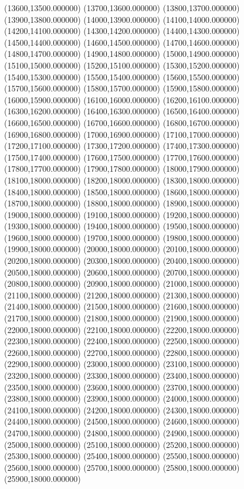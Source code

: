 (13600,13500.000000)
(13700,13600.000000)
(13800,13700.000000)
(13900,13800.000000)
(14000,13900.000000)
(14100,14000.000000)
(14200,14100.000000)
(14300,14200.000000)
(14400,14300.000000)
(14500,14400.000000)
(14600,14500.000000)
(14700,14600.000000)
(14800,14700.000000)
(14900,14800.000000)
(15000,14900.000000)
(15100,15000.000000)
(15200,15100.000000)
(15300,15200.000000)
(15400,15300.000000)
(15500,15400.000000)
(15600,15500.000000)
(15700,15600.000000)
(15800,15700.000000)
(15900,15800.000000)
(16000,15900.000000)
(16100,16000.000000)
(16200,16100.000000)
(16300,16200.000000)
(16400,16300.000000)
(16500,16400.000000)
(16600,16500.000000)
(16700,16600.000000)
(16800,16700.000000)
(16900,16800.000000)
(17000,16900.000000)
(17100,17000.000000)
(17200,17100.000000)
(17300,17200.000000)
(17400,17300.000000)
(17500,17400.000000)
(17600,17500.000000)
(17700,17600.000000)
(17800,17700.000000)
(17900,17800.000000)
(18000,17900.000000)
(18100,18000.000000)
(18200,18000.000000)
(18300,18000.000000)
(18400,18000.000000)
(18500,18000.000000)
(18600,18000.000000)
(18700,18000.000000)
(18800,18000.000000)
(18900,18000.000000)
(19000,18000.000000)
(19100,18000.000000)
(19200,18000.000000)
(19300,18000.000000)
(19400,18000.000000)
(19500,18000.000000)
(19600,18000.000000)
(19700,18000.000000)
(19800,18000.000000)
(19900,18000.000000)
(20000,18000.000000)
(20100,18000.000000)
(20200,18000.000000)
(20300,18000.000000)
(20400,18000.000000)
(20500,18000.000000)
(20600,18000.000000)
(20700,18000.000000)
(20800,18000.000000)
(20900,18000.000000)
(21000,18000.000000)
(21100,18000.000000)
(21200,18000.000000)
(21300,18000.000000)
(21400,18000.000000)
(21500,18000.000000)
(21600,18000.000000)
(21700,18000.000000)
(21800,18000.000000)
(21900,18000.000000)
(22000,18000.000000)
(22100,18000.000000)
(22200,18000.000000)
(22300,18000.000000)
(22400,18000.000000)
(22500,18000.000000)
(22600,18000.000000)
(22700,18000.000000)
(22800,18000.000000)
(22900,18000.000000)
(23000,18000.000000)
(23100,18000.000000)
(23200,18000.000000)
(23300,18000.000000)
(23400,18000.000000)
(23500,18000.000000)
(23600,18000.000000)
(23700,18000.000000)
(23800,18000.000000)
(23900,18000.000000)
(24000,18000.000000)
(24100,18000.000000)
(24200,18000.000000)
(24300,18000.000000)
(24400,18000.000000)
(24500,18000.000000)
(24600,18000.000000)
(24700,18000.000000)
(24800,18000.000000)
(24900,18000.000000)
(25000,18000.000000)
(25100,18000.000000)
(25200,18000.000000)
(25300,18000.000000)
(25400,18000.000000)
(25500,18000.000000)
(25600,18000.000000)
(25700,18000.000000)
(25800,18000.000000)
(25900,18000.000000)
